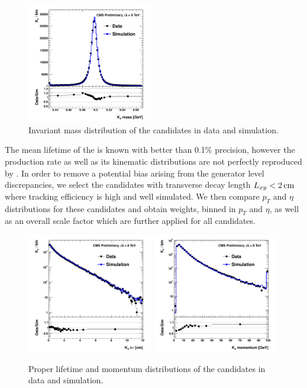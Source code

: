 \begin{figure}[htbp]
\centering
\includegraphics[width=0.49\textwidth]{plots/kshort/ksmass.pdf}
\caption{Invariant mass distribution of the \Kshort candidates in data and simulation. \label{fig:ksmass}}
\end{figure} 


The mean lifetime of the \Kshort is known with better than 0.1\% precision, however the \Kshort
production rate as well as its kinematic distributions are not perfectly reproduced 
by \PYTHIA \cite{Khachatryan:2011tm}.
In order to remove a potential bias arising from the generator level discrepancies, 
we select the \Kshort candidates with transverse decay length $L_{xy}<2\,\text{cm}$ where tracking efficiency
is high and well simulated. We then compare $p_T$ and $\eta$ distributions for these candidates and obtain
weights, binned in $p_T$ and $\eta$, as well as an overall scale factor which are further
 applied for all \Kshort candidates. 

\begin{figure}[htbp]
\centering
\includegraphics[width=0.49\textwidth]{plots/kshort/ksctau.pdf}
\includegraphics[width=0.49\textwidth]{plots/kshort/ksp.pdf}
\caption{Proper lifetime and momentum distributions of the \Kshort candidates in data and simulation. \label{fig:ksctau}}
\end{figure}


